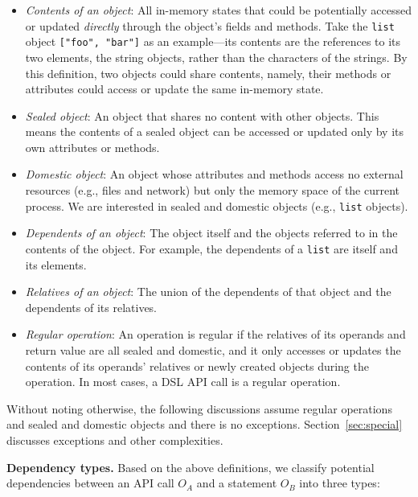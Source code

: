 \documentclass[sigconf]{acmart}\settopmatter{printfolios=true,printccs=false,printacmref=false}\setcopyright{none}
\begin{document}
\begin{itemize}
    \item \textit{Contents of an object}: All in-memory states that could be potentially accessed or updated {\em directly} through the object's fields and methods. Take the \texttt{list} object \texttt{["foo", "bar"]} as an example---its contents are the references to its two elements, the string objects, rather than the characters of the strings. By this definition, two objects could share contents, namely, their methods or attributes could access or update the same in-memory state.
    
    \item \textit{Sealed object}: An object that shares no content with other objects. This means the contents of a sealed object can be accessed or updated only by its own attributes or methods.
    
    \item \textit{Domestic object}: An object whose attributes and methods access no external resources (e.g., files and network) but only the memory space of the current process. We are interested in sealed and domestic objects (e.g., \texttt{list} objects).
    
    \item \textit{Dependents of an object}: The object itself and the objects referred to in the contents of the object. For example, the dependents of a \texttt{list} are itself and its elements.
    
    \item \textit{Relatives of an object}: The union of the dependents of that object and the dependents of its relatives.

    \item \textit{Regular operation}: An operation is regular if the relatives of its operands and return value are all sealed and domestic, and it only accesses or updates the contents of its operands' relatives or newly created objects during the operation. In most cases, a DSL API call is a regular operation.
\end{itemize}

Without noting otherwise, the following discussions assume regular operations and sealed and domestic objects and there is no exceptions. Section~\ref{sec:special} discusses exceptions and other complexities.

\vspace{0.1in}
\noindent\textbf{Dependency types.} Based on the above definitions, we classify potential dependencies between an API call $O_A$ and a statement $O_B$ into three types:
\end{document}

